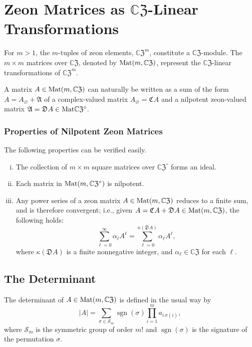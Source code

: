\documentclass{article}
\theoremstyle{definition}
\newcommand{\zco}{\mathfrak{C}\mspace{1mu}}
\newcommand{\zdu}{\mathfrak{D}\mspace{1mu}}
\newcommand{\CZ}{\mathbb{C}\mathfrak{Z}}
\newcommand{\Mat}{{\rm Mat}}
\DeclareMathOperator{\sgn}{sgn}
\numberwithin{equation}{section}
\begin{document}
\section{Zeon Matrices as $\CZ$-Linear Transformations}\label{matrices as transformations}
 
For $m>1$, the $m$-tuples of zeon elements, ${\CZ}^m$, constitute a $\CZ$-module.  The $m\times m$ matrices over $\CZ$, denoted by $\Mat(m,\CZ)$, represent the $\CZ$-linear transformations of ${\CZ}^m$.  

A matrix $A\in\Mat(m,\CZ)$ can naturally be written as a sum of the form $A=A_\varnothing+\mathfrak{A}$ of a complex-valued matrix $A_\varnothing = \zco A$ and a nilpotent zeon-valued matrix $\mathfrak{A}=\zdu A\in\Mat\CZ^\circ$. 

\subsubsection*{Properties of Nilpotent Zeon Matrices} 
The following properties can be verified easily.
\begin{enumerate}[i.]
\item The collection of $m\times m$ square matrices over ${\CZ}^\circ$ forms an ideal.     
\item Each matrix in $\Mat(m,\CZ^\circ)$ is nilpotent.
\item Any power series of a zeon matrix $A\in\Mat(m,\CZ)$ reduces to a finite sum, and is therefore convergent; i.e., given $A=\zco A+\zdu A\in\Mat(m,\CZ)$, the following holds:
\begin{equation*}
\sum_{\ell=0}^\infty \alpha_\ell A^\ell=\sum_{\ell=0}
^{\kappa(\zdu A)}\alpha_\ell A^\ell,
\end{equation*}
where $\kappa(\zdu A)$ is a finite nonnegative integer, and $\alpha_\ell\in\CZ$ for each $\ell$.
\end{enumerate}


\subsection{The Determinant}

The determinant of $A\in\Mat(m,\CZ)$ is defined in the usual way by \begin{equation*}
|A|=\sum_{\sigma\in \mathcal{S}_m}\sgn(\sigma)\prod_{i=1}^m a_{i\,\sigma(i)},
\end{equation*}
where $\mathcal{S}_m$ is the symmetric group of order $m!$ and $\sgn (\sigma)$ is the signature of the permutation $\sigma$.  
\end{document}
